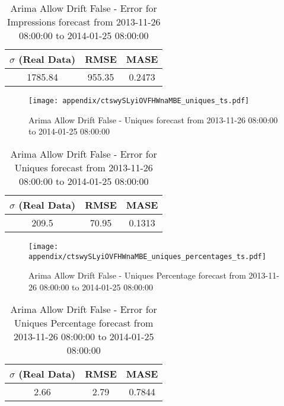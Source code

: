 \begin{table}[H]
\centering
\footnotesize
\begin{tabular}{ccc}
$\sigma$ (Real Data) & RMSE & MASE   \\ \hline
1785.84 & 955.35 & 0.2473 \\
\end{tabular}

\vspace{0.5cm}

\caption{
Arima Allow Drift False - Error for Impressions forecast from 2013-11-26 08:00:00 to 2014-01-25 08:00:00}
\end{table}

\begin{figure}[H] \begin{center} \leavevmode
\texttt{[image: appendix/ctswySLyiOVFHWnaMBE\_uniques\_ts.pdf]} \caption{
Arima Allow Drift False - Uniques forecast from 2013-11-26 08:00:00 to 2014-01-25 08:00:00} \label{fig:appendix/ctswySLyiOVFHWnaMBE_uniques_ts.pdf} \end{center}
\end{figure}

\begin{table}[H]
\centering
\footnotesize
\begin{tabular}{ccc}
$\sigma$ (Real Data) & RMSE & MASE   \\ \hline
209.5 & 70.95 & 0.1313 \\
\end{tabular}

\vspace{0.5cm}

\caption{
Arima Allow Drift False - Error for Uniques forecast from 2013-11-26 08:00:00 to 2014-01-25 08:00:00}
\end{table}

\begin{figure}[H] \begin{center} \leavevmode
\texttt{[image: appendix/ctswySLyiOVFHWnaMBE\_uniques\_percentages\_ts.pdf]} \caption{
Arima Allow Drift False - Uniques Percentage forecast from 2013-11-26 08:00:00 to 2014-01-25 08:00:00} \label{fig:appendix/ctswySLyiOVFHWnaMBE_uniques_percentages_ts.pdf} \end{center}
\end{figure}

\begin{table}[H]
\centering
\footnotesize
\begin{tabular}{ccc}
$\sigma$ (Real Data) & RMSE & MASE   \\ \hline
2.66 & 2.79 & 0.7844 \\
\end{tabular}

\vspace{0.5cm}

\caption{
Arima Allow Drift False - Error for Uniques Percentage forecast from 2013-11-26 08:00:00 to 2014-01-25 08:00:00}
\end{table}


